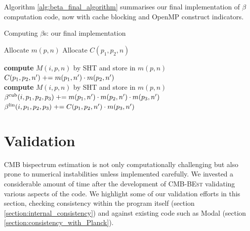 Algorithm \ref{alg:beta_final_algorithm} summarises our final implementation of $\beta$ computation code, now with cache blocking and OpenMP construct indicators.

\begin{algorithm}[htbp]
	\caption{Computing $\beta$s: our final implementation}
	\label{alg:beta_final_algorithm}
	\begin{algorithmic}[1] %
		\State Allocate $m(p,n)$ 
		\State Allocate $C(p_1,p_2,n)$ 
		\\

		\State \textbf{compute} $M(i,p,n)$ by SHT and store in $m(p,n)$
		\EndFor
		\\
		\State $C(p_1,p_2,n') \mathrel{+}= m(p_1,n') \cdot m(p_2,n')$
		\EndFor
		\EndFor
		\EndFor
		\EndFor
		\\
		\State \textbf{compute} $M(i,p,n)$ by SHT and store in $m(p,n)$
		\EndFor
		\\
		\State $\beta^\text{cub}(i, p_1, p_2, p_3) \mathrel{+}= m(p_1,n') \cdot m(p_2,n') \cdot m(p_3,n')$
		\State $\beta^\text{lin}(i, p_1, p_2, p_3) \mathrel{+}= C(p_1, p_2, n') \cdot m( p_3, n')$
		\EndFor
		\EndFor
		\EndFor
		\EndFor
	\end{algorithmic}
\end{algorithm}

\section{Validation} \label{section:validation}

CMB bispectrum estimation is not only computationally challenging but also prone to numerical instabilities unless implemented carefully. We invested a considerable amount of time after the development of \textsc{CMB-BEst} validating various aspects of the code. We highlight some of our validation efforts in this section, checking consistency within the program itself (section \ref{section:internal_consistency}) and against existing code such as Modal \cite{Fergusson2012} (section \ref{section:consistency_with_Planck}).

